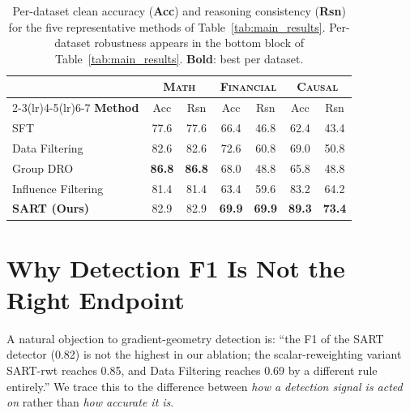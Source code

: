 \begin{table}[h]
\centering
\caption{Per-dataset clean accuracy (\textbf{Acc}) and reasoning consistency (\textbf{Rsn}) for the five representative methods of Table~\ref{tab:main_results}. Per-dataset robustness appears in the bottom block of Table~\ref{tab:main_results}. \textbf{Bold}: best per dataset.}
\label{tab:per_dataset_appendix}
\footnotesize
\setlength{\tabcolsep}{4pt}
\begin{tabular}{l cc cc cc}
\toprule
 & \multicolumn{2}{c}{\textsc{Math}} & \multicolumn{2}{c}{\textsc{Financial}} & \multicolumn{2}{c}{\textsc{Causal}} \\
\cmidrule(lr){2-3}\cmidrule(lr){4-5}\cmidrule(lr){6-7}
\textbf{Method} & Acc & Rsn & Acc & Rsn & Acc & Rsn \\
\midrule
SFT                  & 77.6 & 77.6 & 66.4 & 46.8 & 62.4 & 43.4 \\
Data Filtering       & 82.6 & 82.6 & 72.6 & 60.8 & 69.0 & 50.8 \\
Group DRO            & \textbf{86.8} & \textbf{86.8} & 68.0 & 48.8 & 65.8 & 48.8 \\
Influence Filtering  & 81.4 & 81.4 & 63.4 & 59.6 & 83.2 & 64.2 \\
\textbf{SART (Ours)} & 82.9 & 82.9 & \textbf{69.9} & \textbf{69.9} & \textbf{89.3} & \textbf{73.4} \\
\bottomrule
\end{tabular}
\end{table}

\section{Why Detection F1 Is Not the Right Endpoint}
\label{sec:appendix_f1_decoupling}

A natural objection to gradient-geometry detection is: ``the F1 of the SART detector (0.82) is not the highest in our ablation; the scalar-reweighting variant SART-rwt reaches 0.85, and Data Filtering reaches 0.69 by a different rule entirely.'' We trace this to the difference between \emph{how a detection signal is acted on} rather than \emph{how accurate it is}.

